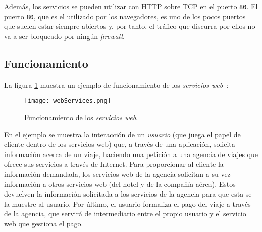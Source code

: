 Además, los servicios se pueden utilizar con \acs{HTTP} sobre \acs{TCP} en el 
puerto \texttt{80}. El puerto \texttt{80}, que es el utilizado por los 
navegadores, es uno de los pocos puertos que suelen estar siempre abiertos y, 
por tanto, el tráfico que discurra por ellos no va a ser bloqueado por ningún 
\emph{firewall}.

  \subsection{Funcionamiento}
La figura \ref{fig:webServices} muestra un ejemplo de funcionamiento de los
\emph{servicios web}~\cite{bib:webServices}:

  \begin{figure}[h]
    \begin{center}
      \texttt{[image: webServices.png]}
      \caption{Funcionamiento de los \emph{servicios web}.}
      \label{fig:webServices}
    \end{center}
  \end{figure}

En el ejemplo se muestra la interacción de un \emph{usuario} (que juega el
papel de cliente dentro de los servicios web) que, a través de una aplicación,
solicita información acerca de un viaje, haciendo una petición a una agencia
de viajes que ofrece sus servicios a través de Internet. Para proporcionar al
cliente la información demandada, los servicios web de la agencia solicitan a
su vez información a otros servicios web (del hotel y de la compañía aérea).
Estos devuelven la información solicitada a los servicios de la agencia para
que esta se la muestre al usuario. Por último, el usuario formaliza el pago del
viaje a través de la agencia, que servirá de intermediario entre el propio
usuario y el servicio web que gestiona el pago.

